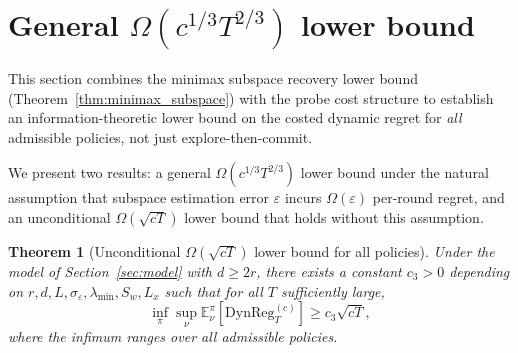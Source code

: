 \documentclass[12pt]{article}
\newcommand{\E}{\mathbb{E}}
\newcommand{\DynReg}{\mathrm{DynReg}}
\newtheorem{theorem}{Theorem}
\theoremstyle{plain}
\theoremstyle{definition}
\begin{document}
\section{\texorpdfstring{General $\Omega(c^{1/3}T^{2/3})$ lower bound}{General Omega(c^(1/3) T^(2/3)) lower bound}}
\label{sec:probe_rate_lb}

This section combines the minimax subspace recovery lower bound (Theorem~\ref{thm:minimax_subspace}) with the probe cost structure to establish an information-theoretic lower bound on the costed dynamic regret for \emph{all} admissible policies, not just explore-then-commit.

We present two results: a general $\Omega(c^{1/3}T^{2/3})$ lower bound under the natural assumption that subspace estimation error $\varepsilon$ incurs $\Omega(\varepsilon)$ per-round regret, and an unconditional $\Omega(\sqrt{cT})$ lower bound that holds without this assumption.

\begin{theorem}[Unconditional $\Omega(\sqrt{cT})$ lower bound for all policies]
\label{thm:sqrt_ct_lb}
Under the model of Section~\ref{sec:model} with $d \ge 2r$, there exists a constant $c_3 > 0$ depending on $r, d, L, \sigma_\varepsilon, \lambda_{\min}, S_w, L_x$ such that for all $T$ sufficiently large,
\[
\inf_\pi \sup_\nu \E_\nu^\pi[\DynReg_T^{(c)}] \ge c_3\sqrt{cT},
\]
where the infimum ranges over all admissible policies.
\end{theorem}
\end{document}
